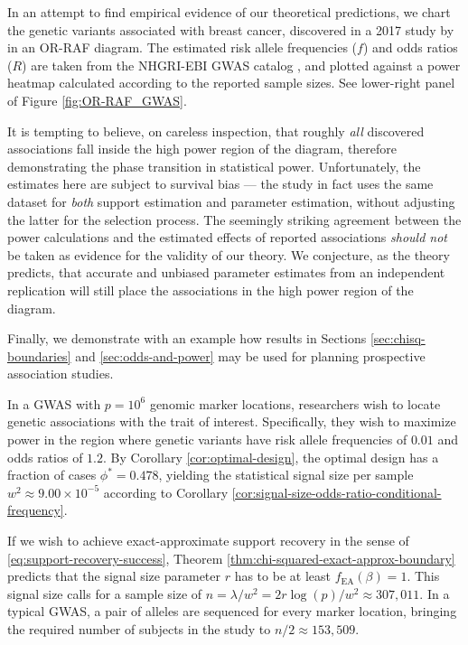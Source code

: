 \begin{remark}
\label{rmk:OR-RAF_false_evidence}
In an attempt to find empirical evidence of our theoretical predictions, we chart the genetic variants associated with breast cancer, discovered in a 2017 study by \citet{michailidou2017association} in an OR-RAF diagram. 
The estimated risk allele frequencies ($f$) and odds ratios ($R$) are taken from the NHGRI-EBI GWAS catalog \cite{macarthur2016new}, and plotted against a power heatmap calculated according to the reported sample sizes. 
See lower-right panel of Figure \ref{fig:OR-RAF_GWAS}.

It is tempting to believe, on careless inspection, that roughly \emph{all} discovered associations fall inside the high power region of the diagram, therefore demonstrating the phase transition in statistical power.
Unfortunately, the estimates here are subject to survival {bias} --- the study in fact uses the {same} dataset for \emph{both} support estimation and parameter estimation, without adjusting the latter for the selection process.
The seemingly striking agreement between the power calculations and the estimated effects of reported associations \emph{should not} be taken as evidence for the validity of our theory.
We conjecture, as the theory predicts, that accurate and unbiased parameter estimates from an independent replication will still place the associations in the high power region of the diagram. 
\end{remark}

Finally, we demonstrate with an example how results in Sections \ref{sec:chisq-boundaries} and \ref{sec:odds-and-power} may be used for planning prospective association studies.

\begin{example}
In a GWAS with $p = 10^6$ genomic marker locations, researchers wish to locate genetic associations with the trait of interest.
Specifically, they wish to maximize power in the region where genetic variants have risk allele frequencies of $0.01$ and odds ratios of $1.2$.
By Corollary \ref{cor:optimal-design}, the optimal design has a fraction of cases $\phi^* = 0.478$, yielding the statistical signal size per sample $w^2\approx9.00\times10^{-5}$ according to Corollary \ref{cor:signal-size-odds-ratio-conditional-frequency}.

If we wish to achieve exact-approximate support recovery in the sense of \eqref{eq:support-recovery-success}, Theorem \ref{thm:chi-squared-exact-approx-boundary} predicts that the signal size parameter $r$ has to be at least $f_{\mathrm{EA}}(\beta)= 1$.
This signal size calls for a sample size of $n = \lambda / w^2 = 2r\log(p)/w^2 \approx 307,011$.
In a typical GWAS, a pair of alleles are sequenced for every marker location, bringing the required number of subjects in the study to $n/2 \approx 153,509$.
\end{example}

